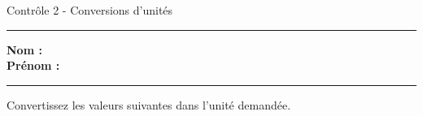 \documentclass[11pt,a4paper]{article}
\begin{document}
\begin{center}
 \LARGE{Contrôle 2 - Conversions d'unités} \\[3mm]
\end{center}
\hrule
\vspace{0.3cm}


\textbf{Nom :} \\[1mm]

\textbf{Prénom :} \\[1mm]

\hrule 
\vspace{1cm}

\begin{center}
    Convertissez les valeurs suivantes dans l'unité demandée.
\end{center}
\vspace{5mm}
\end{document}
